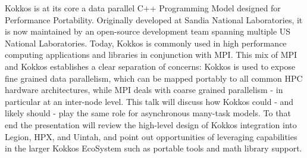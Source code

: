 Kokkos is at its core a data parallel C++ Programming Model designed for Performance Portability.
Originally developed at Sandia National Laboratories, it is now maintained by an open-source development team spanning multiple US National Laboratories.
Today, Kokkos is commonly used in high performance computing applications and libraries in conjunction with MPI.
This mix of MPI and Kokkos establishes a clear separation of concerns: Kokkos is used to expose fine grained data parallelism,
which can be mapped portably to all common HPC hardware architectures,
while MPI deals with coarse grained parallelism - in particular at an inter-node level.
This talk will discuss how Kokkos could - and likely should - play the same role for asynchronous many-task models.
To that end the presentation will review the high-level design of Kokkos integration into Legion, HPX, and Uintah, and point out opportunities of leveraging capabilities in the larger Kokkos EcoSystem such as portable tools and math library support.